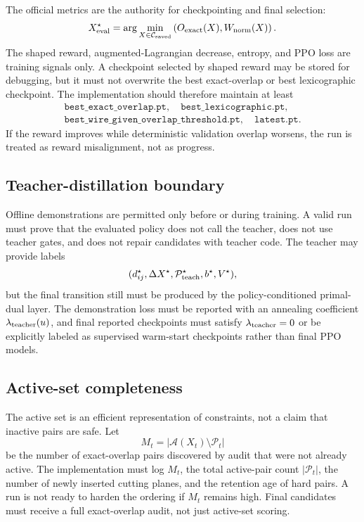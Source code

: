 \documentclass[11pt]{article}
\newcommand{\Pset}{\mathcal{P}}
\newcommand{\Audit}{\mathcal{A}}
\newcommand{\ExactOv}{O_{\rm exact}}
\newcommand{\WireNorm}{W_{\rm norm}}
\begin{document}
The official metrics are the authority for checkpointing and final selection:
\[
    X^{\star}_{\rm eval}=\arg\min_{X\in\mathcal C_{\rm saved}}
    \left(\ExactOv(X),\WireNorm(X)\right).
\]
The shaped reward, augmented-Lagrangian decrease, entropy, and PPO loss are training signals only. A checkpoint selected by shaped reward may be stored for debugging, but it must not overwrite the best exact-overlap or best lexicographic checkpoint. The implementation should therefore maintain at least
\[
\begin{gathered}
    \texttt{best\_exact\_overlap.pt},\quad
    \texttt{best\_lexicographic.pt},\\
    \texttt{best\_wire\_given\_overlap\_threshold.pt},\quad
    \texttt{latest.pt}.
\end{gathered}
\]
If the reward improves while deterministic validation overlap worsens, the run is treated as reward misalignment, not as progress.

\subsection{Teacher-distillation boundary}

Offline demonstrations are permitted only before or during training. A valid run must prove that the evaluated policy does not call the teacher, does not use teacher gates, and does not repair candidates with teacher code. The teacher may provide labels
\[
    (d_{ij}^{\star},\Delta X^{\star},\Pset_{\rm teach}^{\star},b^{\star},V^{\star}),
\]
but the final transition still must be produced by the policy-conditioned primal-dual layer. The demonstration loss must be reported with an annealing coefficient $\lambda_{\rm teacher}(u)$, and final reported checkpoints must satisfy $\lambda_{\rm teacher}=0$ or be explicitly labeled as supervised warm-start checkpoints rather than final PPO models.

\subsection{Active-set completeness}

The active set is an efficient representation of constraints, not a claim that inactive pairs are safe. Let
\[
    M_t = \left|\Audit(X_t)\setminus \Pset_t\right|
\]
be the number of exact-overlap pairs discovered by audit that were not already active. The implementation must log $M_t$, the total active-pair count $|\Pset_t|$, the number of newly inserted cutting planes, and the retention age of hard pairs. A run is not ready to harden the ordering if $M_t$ remains high. Final candidates must receive a full exact-overlap audit, not just active-set scoring.
\end{document}
